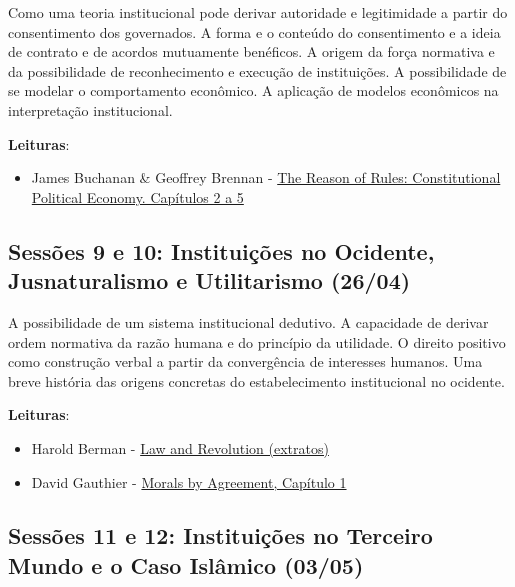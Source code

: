 \documentclass[12pt,]{article}
\providecommand{\tightlist}{%
  \setlength{\itemsep}{0pt}\setlength{\parskip}{0pt}}
\begin{document}
Como uma teoria institucional pode derivar autoridade e legitimidade a
partir do consentimento dos governados. A forma e o conteúdo do
consentimento e a ideia de contrato e de acordos mutuamente benéficos. A
origem da força normativa e da possibilidade de reconhecimento e
execução de instituições. A possibilidade de se modelar o comportamento
econômico. A aplicação de modelos econômicos na interpretação
institucional.

\textbf{Leituras}:

\begin{itemize}
\tightlist
\item
  James Buchanan \& Geoffrey Brennan -
  \href{https://github.com/danilofreire/economia-politica-instituicoes-ufm/blob/master/sessoes-07-08/buchanan-brennan.pdf}{The
  Reason of Rules: Constitutional Political Economy. Capítulos 2 a 5}
\end{itemize}

\subsection{Sessões 9 e 10: Instituições no Ocidente, Jusnaturalismo e
Utilitarismo
(26/04)}\label{sessoes-9-e-10-instituicoes-no-ocidente-jusnaturalismo-e-utilitarismo-2604}

A possibilidade de um sistema institucional dedutivo. A capacidade de
derivar ordem normativa da razão humana e do princípio da utilidade. O
direito positivo como construção verbal a partir da convergência de
interesses humanos. Uma breve história das origens concretas do
estabelecimento institucional no ocidente.

\textbf{Leituras}:

\begin{itemize}
\tightlist
\item
  Harold Berman -
  \href{https://github.com/danilofreire/economia-politica-instituicoes-ufm/blob/master/sessoes-09-10/berman.pdf}{Law
  and Revolution (extratos)}
\item
  David Gauthier -
  \href{https://github.com/danilofreire/economia-politica-instituicoes-ufm/blob/master/sessoes-09-10/gauthier.pdf}{Morals
  by Agreement, Capítulo 1}
\end{itemize}

\subsection{Sessões 11 e 12: Instituições no Terceiro Mundo e o Caso
Islâmico
(03/05)}\label{sessoes-11-e-12-instituicoes-no-terceiro-mundo-e-o-caso-islamico-0305}
\end{document}
